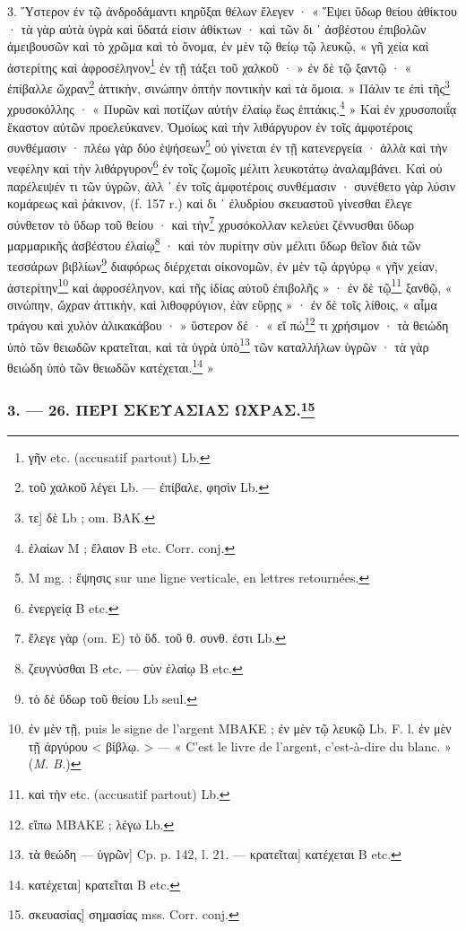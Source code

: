 \documentclass[a4paper, 11pt, oneside, polutonikogreek, french]{article}
\begin{document}
3. Ὕστερον ἐν τῷ ἀνδροδάμαντι κηρῦξαι θέλων ἔλεγεν · « Ἕψει ὕδωρ θείου ἀθίκτου · τὰ γὰρ αὐτὰ ὑγρὰ καὶ ὕδατά εἰσιν ἀθίκτων · καὶ τῶν δι ᾽ ἀσβέστου ἐπιβολῶν ἀμειβουσῶν καὶ τὸ χρῶμα καὶ τὸ ὄνομα, ἐν μὲν τῷ θείῳ τῷ λευκῷ, « γῆ χεία καὶ ἀστερίτης καὶ ἀφροσέληνον\footnote{γῆν etc. (accusatif partout) Lb.} ἐν τῇ τάξει τοῦ χαλκοῦ · » ἐν δὲ τῷ ξαντῷ · « ἐπίβαλλε ὤχραν\footnote{τοῦ χαλκοῦ λέγει Lb. --- ἐπίβαλε, φησὶν Lb.} ἀττικὴν, σινώπην ὀπτὴν ποντικὴν καὶ τὰ ὅμοια. » Πάλιν τε ἐπὶ τῆς\footnote{τε] δὲ Lb ; om. BAK.} χρυσοκόλλης · « Πυρῶν καὶ ποτίζων αὐτὴν ἐλαίῳ ἕως ἑπτάκις.\footnote{ἐλαίων M ; ἔλαιον B etc. Corr. conj.} » Καὶ ἐν χρυσοποιΐᾳ ἕκαστον αὐτῶν προελεύκανεν. Ὁμοίως καὶ τὴν λιθάργυρον ἐν τοῖς ἀμφοτέροις συνθέμασιν · πλέω γὰρ δύο ἑψήσεων\footnote{M mg. : ἕψησις sur une ligne verticale, en lettres retournées.} οὐ γίνεται ἐν τῇ κατενεργεία · ἀλλὰ καὶ τὴν νεφέλην καὶ τὴν λιθάργυρον\footnote{ἐνεργείᾳ B etc.} ἐν τοῖς ζωμοῖς μέλιτι λευκοτάτῳ ἀναλαμβάνει. Καὶ οὐ παρέλειψέν τι τῶν ὑγρῶν, ἀλλ ᾽ ἐν τοῖς ἀμφοτέροις συνθέμασιν · συνέθετο γὰρ λύσιν κομάρεως καὶ ῥάκινον, (f. 157 r.) καὶ δι ᾽ ἐλυδρίου σκευαστοῦ γίνεσθαι ἔλεγε σύνθετον τὸ ὕδωρ τοῦ θείου · καὶ τὴν\footnote{ἔλεγε γὰρ (om. E) τὸ ὕδ. τοῦ θ. συνθ. ἐστι Lb.} χρυσόκολλαν κελεύει ζέννυσθαι ὕδωρ μαρμαρικῆς ἀσβέστου ἐλαίῳ\footnote{ζευγνύσθαι B etc. --- σὺν ἐλαίῳ B etc.} · καὶ τὸν πυρίτην σὺν μέλιτι ὕδωρ θεῖον διὰ τῶν τεσσάρων βιβλίων\footnote{τὸ δὲ ὕδωρ τοῦ θείου Lb seul.} διαφόρως διέρχεται οἰκονομῶν, ἐν μὲν τῷ ἀργύρῳ « γῆν χείαν, ἀστερίτην\footnote{ἐν μὲν τῇ, puis le signe de l'argent MBAΚE ; ἐν μὲν τῷ λευκῷ Lb. F. l. ἐν μὲν τῇ άργύρου < βίβλῳ. > --- « C'est le livre de l'argent, c'est-à-dire du blanc. » (\emph{M. B.})} καὶ ἀφροσέληνον, καὶ τῆς ἰδίας αὐτοῦ ἐπιβολῆς » · ἐν δὲ τῷ\footnote{καὶ τὴν etc. (accusatif partout) Lb.} ξανθῷ, « σινώπην, ὤχραν ἀττικὴν, καὶ λιθοφρύγιον, ἐὰν εὕρῃς » · ἐν δὲ τοῖς λίθοις, « αἷμα τράγου καὶ χυλὸν ἁλικακάβου · » ὕστερον δέ · « εἴ πώ\footnote{εἴπω MBAKE ; λέγω Lb.} τι χρήσιμον · τὰ θειώδη ὑπὸ τῶν θειωδῶν κρατεῖται, καὶ τὰ ὑγρὰ ὑπὸ\footnote{τὰ θεώδη --- ὑγρῶν] Cp. p. 142, l. 21. --- κρατεῖται] κατέχεται B etc.} τῶν καταλλήλων ὑγρῶν · τὰ γὰρ θειώδη ὑπὸ τῶν θειωδῶν κατέχεται.\footnote{κατέχεται] κρατεῖται B etc.} »

\bigskip
\centerline{\EightStarTaper}
\centerline{\EightStarTaper\EightStarTaper}
\bigskip

\subsubsection[3. --- 26. ΠΕΡΙ ΣΚΕΥΑΣΙΑΣ ΩΧΡΑΣ.]{3. --- 26. ΠΕΡΙ ΣΚΕΥΑΣΙΑΣ ΩΧΡΑΣ.\footnote{σκευασίας] σημασίας mss. Corr. conj.}}
\end{document}
